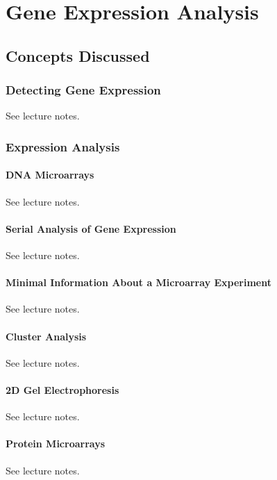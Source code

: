 
\chapter{Gene Expression Analysis} 

\label{Chapter9} 

\section{Concepts Discussed}

    \subsection{Detecting Gene Expression}
    See lecture notes.\autocite{T9}

    \subsection{Expression Analysis}
        \subsubsection{DNA Microarrays}
        See lecture notes.\autocite{T9}
            
        \subsubsection{Serial Analysis of Gene Expression }
        See lecture notes.\autocite{T9}
    
        \subsubsection{Minimal Information About a Microarray Experiment }
        See lecture notes.\autocite{T9}
    
        \subsubsection{Cluster Analysis}
        See lecture notes.\autocite{T9}
    
        \subsubsection{2D Gel Electrophoresis}
        See lecture notes.\autocite{T9}
    
        \subsubsection{Protein Microarrays}
        See lecture notes.\autocite{T9}
    
